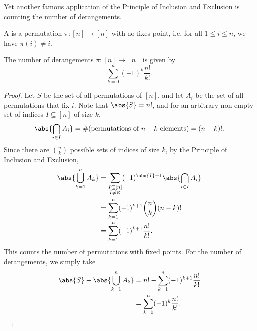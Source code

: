 Yet another famous application of the Principle of Inclusion and Exclusion is counting the number of derangements.

\begin{definition}
    A  is a permutation $\pi : [n] \to [n]$ with no fixes point, i.e. for all $1 \leq i \leq n$, we have $\pi(i) \neq i$.
\end{definition}

\begin{proposition}
    The number of derangements $\pi : [n] \to [n]$ is given by \[\sum_{k = 0}^n (-1)^k \frac{n!}{k!}.\]
\end{proposition}
\begin{proof}
    Let $S$ be the set of all permutations of $[n]$, and let $A_i$ be the set of all permutations that fix $i$. Note that $\abs{S} = n!$, and for an arbitrary non-empty set of indices $I \subseteq [n]$ of size $k$, \[\abs{\bigcap_{i \in I} A_i} = \text{\#(permutations of $n-k$ elements)} = (n-k)!.\] Since there are $\binom{n}{k}$ possible sets of indices of size $k$, by the Principle of Inclusion and Exclusion,
    \begin{align*}
        \abs{\bigcup_{k = 1}^n A_k} &= \sum_{\substack{I \subseteq [n]\\I \neq \varnothing}} (-1)^{\abs{I} + 1} \abs{\bigcap_{i \in I} A_i}\\
        &= \sum_{k = 1}^{n} (-1)^{k+1} \binom{n}{k} (n-k)!\\
        &= \sum_{k = 1}^{n} (-1)^{k+1} \frac{n!}{k!}.
    \end{align*}
    This counts the number of permutations with fixed points. For the number of derangements, we simply take
    \begin{align*}
        \abs{S} - \abs{\bigcup_{k = 1}^n A_k} &= n! - \sum_{k = 1}^{n} (-1)^{k+1} \frac{n!}{k!}\\
        &= \sum_{k = 0}^n (-1)^k \frac{n!}{k!}.
    \end{align*}
\end{proof}